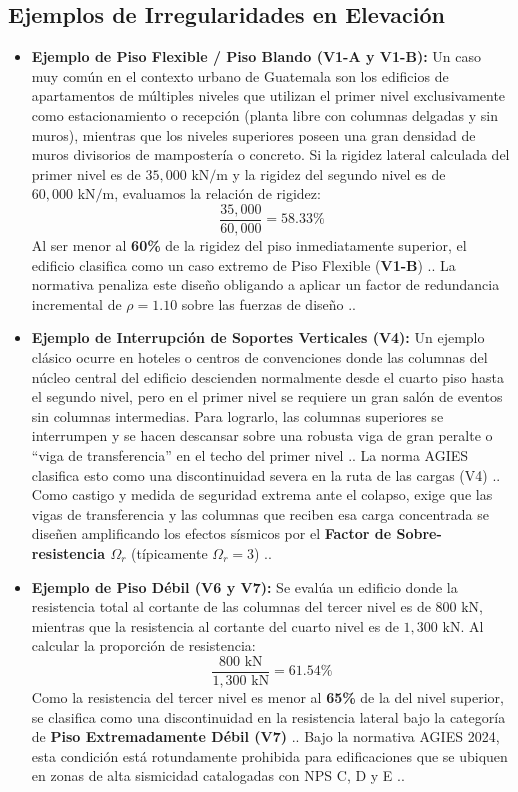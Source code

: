 \documentclass[14pt,letterpaper]{extarticle}
\begin{document}
	\subsection{Ejemplos de Irregularidades en Elevación}
	
	\begin{itemize}
		\item \textbf{Ejemplo de Piso Flexible / Piso Blando (V1-A y V1-B):}
		Un caso muy común en el contexto urbano de Guatemala son los edificios de apartamentos de múltiples niveles que utilizan el primer nivel exclusivamente como estacionamiento o recepción (planta libre con columnas delgadas y sin muros), mientras que los niveles superiores poseen una gran densidad de muros divisorios de mampostería o concreto. 
		Si la rigidez lateral calculada del primer nivel es de $35,000\text{ kN/m}$ y la rigidez del segundo nivel es de $60,000\text{ kN/m}$, evaluamos la relación de rigidez:
		\[ \frac{35,000}{60,000} = 58.33\% \]
		Al ser menor al \textbf{60\%} de la rigidez del piso inmediatamente superior, el edificio clasifica como un caso extremo de Piso Flexible (\textbf{V1-B}) .. La normativa penaliza este diseño obligando a aplicar un factor de redundancia incremental de $\rho = 1.10$ sobre las fuerzas de diseño ..
		
		\item \textbf{Ejemplo de Interrupción de Soportes Verticales (V4):}
		Un ejemplo clásico ocurre en hoteles o centros de convenciones donde las columnas del núcleo central del edificio descienden normalmente desde el cuarto piso hasta el segundo nivel, pero en el primer nivel se requiere un gran salón de eventos sin columnas intermedias. Para lograrlo, las columnas superiores se interrumpen y se hacen descansar sobre una robusta viga de gran peralte o ``viga de transferencia'' en el techo del primer nivel ..
		La norma AGIES clasifica esto como una discontinuidad severa en la ruta de las cargas (V4) .. Como castigo y medida de seguridad extrema ante el colapso, exige que las vigas de transferencia y las columnas que reciben esa carga concentrada se diseñen amplificando los efectos sísmicos por el \textbf{Factor de Sobre-resistencia $\Omega_r$} (típicamente $\Omega_r = 3$) ..
		
		\item \textbf{Ejemplo de Piso Débil (V6 y V7):}
		Se evalúa un edificio donde la resistencia total al cortante de las columnas del tercer nivel es de $800\text{ kN}$, mientras que la resistencia al cortante del cuarto nivel es de $1,300\text{ kN}$. Al calcular la proporción de resistencia:
		\[ \frac{800\text{ kN}}{1,300\text{ kN}} = 61.54\% \]
		Como la resistencia del tercer nivel es menor al \textbf{65\%} de la del nivel superior, se clasifica como una discontinuidad en la resistencia lateral bajo la categoría de \textbf{Piso Extremadamente Débil (V7)} .. Bajo la normativa AGIES 2024, esta condición está rotundamente prohibida para edificaciones que se ubiquen en zonas de alta sismicidad catalogadas con NPS C, D y E ..
	\end{itemize}
	
\end{document}

